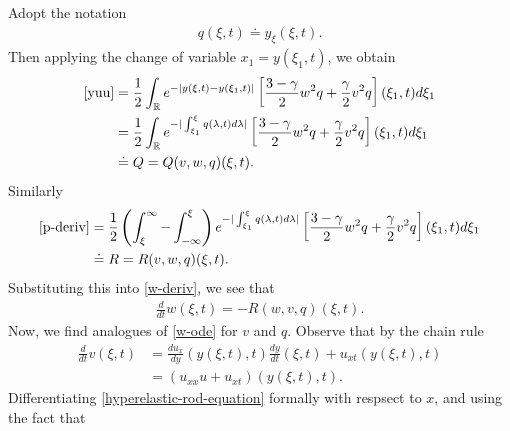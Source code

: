\documentclass[12pt,reqno]{amsart}
\numberwithin{equation}{section}  %
\numberwithin{figure}{section}
\newcommand{\rr}{\mathbb{R}}
\begin{document}
%
%
Adopt the notation 
%
%
\begin{equation*}
\begin{split}
q(\xi, t) \doteq y_{\xi}(\xi, t).
\end{split}
\end{equation*}
%
%
Then applying the change of variable $x_{1} = y(\xi_{1}, t)$, we obtain
%
%
\begin{equation*}
\begin{split}
\eqref{yuu} & = \frac{1}{2} \int_{\rr} e^{-| y(\xi, t) - y(\xi_{1}, t) |} \left [
\frac{3 -\gamma}{2} w^{2}q + \frac{\gamma}{2} v^{2} q  \right ](\xi_{1}, t) d \xi_{1}
\\
& = \frac{1}{2} \int_{\rr} e^{-| \int_{\xi_{1}}^{\xi} q(\lambda, t) d \lambda |} \left [
\frac{3 -\gamma}{2} w^{2}q + \frac{\gamma}{2} v^{2} q  \right ](\xi_{1}, t) d \xi_{1}
\\
& \doteq Q = Q(v, w, q)(\xi, t).
\end{split}
\end{equation*}
%
%
Similarly
%
%
\begin{equation}
\label{R-def}
\begin{split}
\eqref{p-deriv} & = \frac{1}{2} \left ( \int_{\xi}^{\infty} -
\int_{-\infty}^{\xi} \right ) e^{-| \int_{\xi_{1}}^{\xi} q(\lambda, t) d \lambda 
|} \left [ \frac{3 - \gamma}{2} w^{2} q + \frac{\gamma}{2} v^{2} q \right ] (\xi_{1}, t) d \xi_{1}
\\
& \doteq R = R(v, w, q)(\xi, t). 
\end{split}
\end{equation}
%
Substituting this into \eqref{w-deriv}, we see that
%
%
\begin{equation}
\label{w-ode}
\begin{split}
\frac{d}{dt}w(\xi, t) = -R(w, v, q)(\xi, t).
\end{split}
\end{equation}
%
%
Now, we find analogues of \eqref{w-ode} for $v$ and $q$. Observe that by the
chain rule 
%
\begin{equation}
\label{lkk}
\begin{split}
\frac{d}{dt}v(\xi, t)
&  = \frac{du_{x}}{dy}(y(\xi, t), t) \frac{dy}{dt}(\xi, t) + u_{xt}(y(\xi, t), t)
\\
& =  (u_{xx}u + u_{xt})(y(\xi, t), t).
\end{split}
\end{equation}
%
Differentiating \eqref{hyperelastic-rod-equation} formally with respsect to $x$,
and using the fact that
%
%
\end{document}
